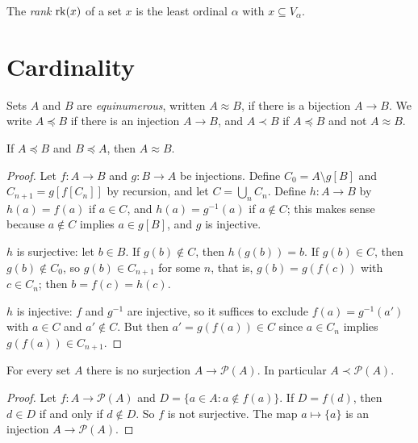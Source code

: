 \begin{definition}\label{sets:definition-rank}
The \emph{rank} $\operatorname{rk}(x)$ of a set $x$ is the least ordinal $\alpha$ with
$x \subseteq V_\alpha$.
\end{definition}

\section{Cardinality}\label{sets:section-cardinality}

\begin{definition}\label{sets:definition-equinumerous}
Sets $A$ and $B$ are \emph{equinumerous}, written $A \approx B$, if there is a
bijection $A \to B$. We write $A \preceq B$ if there is an injection $A \to B$,
and $A \prec B$ if $A \preceq B$ and not $A \approx B$.
\end{definition}

\begin{theorem}\label{sets:theorem-schroder-bernstein}
If $A \preceq B$ and $B \preceq A$, then $A \approx B$.
\end{theorem}

\begin{proof}
Let $f \colon A \to B$ and $g \colon B \to A$ be injections. Define
$C_0 = A \setminus g[B]$ and $C_{n+1} = g[f[C_n]]$ by recursion, and let
$C = \bigcup_n C_n$. Define $h \colon A \to B$ by $h(a) = f(a)$ if $a \in C$, and
$h(a) = g^{-1}(a)$ if $a \notin C$; this makes sense because $a \notin C$
implies $a \in g[B]$, and $g$ is injective.

$h$ is surjective: let $b \in B$. If $g(b) \notin C$, then $h(g(b)) = b$. If
$g(b) \in C$, then $g(b) \notin C_0$, so $g(b) \in C_{n+1}$ for some $n$, that
is, $g(b) = g(f(c))$ with $c \in C_n$; then $b = f(c) = h(c)$.

$h$ is injective: $f$ and $g^{-1}$ are injective, so it suffices to exclude
$f(a) = g^{-1}(a')$ with $a \in C$ and $a' \notin C$. But then
$a' = g(f(a)) \in C$ since $a \in C_n$ implies $g(f(a)) \in C_{n+1}$.
\end{proof}

\begin{theorem}[Cantor]\label{sets:theorem-cantor}
For every set $A$ there is no surjection $A \to \mathcal{P}(A)$. In particular
$A \prec \mathcal{P}(A)$.
\end{theorem}

\begin{proof}
Let $f \colon A \to \mathcal{P}(A)$ and $D = \{a \in A : a \notin f(a)\}$. If
$D = f(d)$, then $d \in D$ if and only if $d \notin D$. So $f$ is not
surjective. The map $a \mapsto \{a\}$ is an injection $A \to \mathcal{P}(A)$.
\end{proof}

